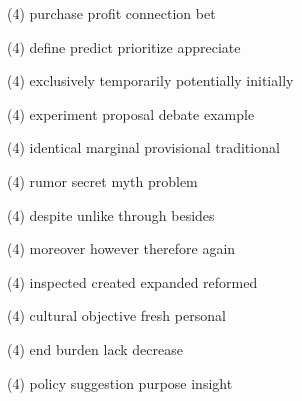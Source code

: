 \item
\begin{tasks}(4)
	\task purchase
	\task profit
	\task connection
	\task bet
\end{tasks}
\item
\begin{tasks}(4)
	\task define
	\task predict
	\task prioritize
	\task appreciate
\end{tasks}
\item
\begin{tasks}(4)
	\task exclusively
	\task temporarily
	\task potentially
	\task initially
\end{tasks}
\item
\begin{tasks}(4)
	\task experiment
	\task proposal
	\task debate
	\task example
\end{tasks}
\item
\begin{tasks}(4)
	\task identical
	\task marginal
	\task provisional
	\task traditional
\end{tasks}
\item
\begin{tasks}(4)
	\task rumor
	\task secret
	\task myth
	\task problem
\end{tasks}
\item
\begin{tasks}(4)
	\task despite
	\task unlike
	\task through
	\task besides
\end{tasks}
\item
\begin{tasks}(4)
	\task moreover
	\task however
	\task therefore
	\task again
\end{tasks}
\item
\begin{tasks}(4)
	\task inspected
	\task created
	\task expanded
	\task reformed
\end{tasks}
\item
\begin{tasks}(4)
	\task cultural
	\task objective
	\task fresh
	\task personal
\end{tasks}
\item
\begin{tasks}(4)
	\task end
	\task burden
	\task lack
	\task decrease
\end{tasks}
\item
\begin{tasks}(4)
	\task policy
	\task suggestion
	\task purpose
	\task insight
\end{tasks}
